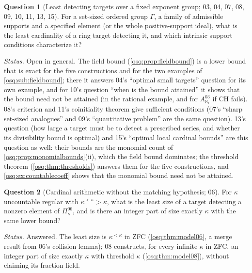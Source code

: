 \documentclass[11pt,letterpaper]{article}
\numberwithin{equation}{section}
\theoremstyle{definition}
\newtheorem{question}[question]{Question}
\theoremstyle{remark}
\theoremstyle{plain}
\begin{document}
\begin{question}[Least detecting targets over a fixed exponent group; 03, 04, 07, 08, 09, 10, 11, 13, 15]\label{osq:q:fixed}
For a set-sized ordered group $\Gamma$, a family of admissible supports and a specified element (or
the whole positive-support ideal), what is the least cardinality of a ring target detecting it, and
which intrinsic support conditions characterize it?
\end{question}
\emph{Status.} Open in general. The field bound (\cref{osq:prop:fieldbound}) is a lower bound that is
exact for the five constructions and for the two examples of \cref{osq:sub:fieldbound}; there it answers
04's ``optimal small targets'' question for its own example, and for 10's question ``when is the
bound attained'' it shows that the bound need not be attained (in the rational example, and for
$A^{03}_{\aleph_1}$ if CH fails). 08's criterion
and 11's coinitiality theorem give sufficient conditions (07's ``sharp set-sized analogues'' and 09's
``quantitative problem'' are the same question). 13's question (how large a target must be to detect a prescribed
series, and whether its divisibility bound is optimal) and 15's ``optimal local cardinal bounds'' are this question as
well: their bounds are the monomial count of \cref{osq:prop:monomialbounds}(ii), which the field bound dominates; the
threshold theorem (\cref{osq:thm:thresholds}) answers them for the five constructions, and \cref{osq:ex:countablecoeff}
shows that the monomial bound need not be attained.

\begin{question}[Cardinal arithmetic without the matching hypothesis; 06]\label{osq:q:kappa}
For $\kappa$ uncountable regular with $\kappa^{<\kappa}>\kappa$, what is the least size of a target
detecting a nonzero element of $\Pi^{06}_\kappa$, and is there an integer part of size exactly $\kappa$
with the same lower bound?
\end{question}
\emph{Status.} Answered. The least size is $\kappa^{<\kappa}$ in ZFC (\cref{osq:thm:model06}, a merge
result from 06's collision lemma); 08 constructs, for every infinite $\kappa$ in ZFC, an integer part of
size exactly $\kappa$ with threshold $\kappa$ (\cref{osq:thm:model08}), without claiming its fraction field.
\end{document}
